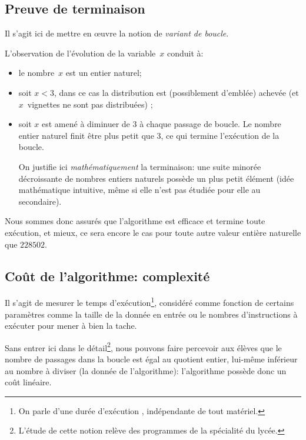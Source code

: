 \subsection{Preuve de terminaison}

Il s'agit ici de mettre en œuvre la notion de \emph{variant de boucle}.

L'observation de l'évolution de la variable~$x$ conduit à:

\begin{itemize}

\item le nombre~$x$ est un entier naturel;

\item soit $x < 3$, dans ce cas la distribution est (possiblement d'emblée) achevée (et $x$~vignettes ne sont pas distribuées) ;

\item soit $x$ est amené à diminuer de $3$ à chaque passage de boucle. Le nombre entier naturel finit être plus petit que $3$, ce qui termine l'exécution de la boucle.

On justifie ici \emph{mathématiquement} la terminaison: une suite minorée décroissante de nombres entiers naturels possède un plus petit élément (idée mathématique intuitive, même si elle n'est pas étudiée pour elle au secondaire).

\end{itemize}

%



Nous sommes donc assurés que l'algorithme est efficace et termine toute exécution, et mieux, ce sera encore le cas pour toute autre valeur entière naturelle que $\num{228502}$.


\subsection{Coût de l'algorithme: complexité}

Il s'agit de mesurer le temps d'exécution\footnote{On parle d'une durée d'exécution , indépendante de tout matériel.}, considéré comme fonction de certains paramètres comme la taille de la donnée en entrée ou le nombres d'instructions à exécuter pour mener à bien la tache.

Sans entrer ici dans le détail\footnote{L'étude de cette notion relève des programmes de la spécialité  du lycée.}, nous pouvons faire percevoir aux élèves que le nombre de passages dans la boucle est égal au quotient entier, lui-même inférieur au nombre à diviser (la donnée de l'algorithme): l'algorithme possède donc un coût linéaire.

